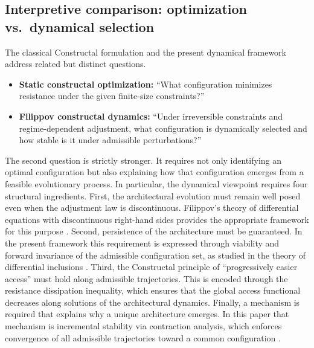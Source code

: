 \documentclass[12pt]{article}
\theoremstyle{plain}
\theoremstyle{definition}
\theoremstyle{remark}
\begin{document}
\subsection{Interpretive comparison: optimization vs.\ dynamical selection}
\label{subsec:discussion_opt_vs_dyn}

The classical Constructal formulation and the present dynamical
framework address related but distinct questions.

\begin{itemize}[leftmargin=1.5em]

\item \textbf{Static constructal optimization:}
``What configuration minimizes resistance under the given
finite-size constraints?''

\item \textbf{Filippov constructal dynamics:}
``Under irreversible constraints and regime-dependent adjustment,
what configuration is dynamically selected and how stable is it
under admissible perturbations?''

\end{itemize}

The second question is strictly stronger.
It requires not only identifying an optimal configuration but also
explaining how that configuration emerges from a feasible evolutionary
process.
In particular, the dynamical viewpoint requires four structural
ingredients. First, the architectural evolution must remain well posed even when the
adjustment law is discontinuous.
Filippov’s theory of differential equations with discontinuous
right-hand sides provides the appropriate framework for this purpose
\cite{Filippov1988,diBernardo2008}. Second, persistence of the architecture must be guaranteed.
In the present framework this requirement is expressed through
viability and forward invariance of the admissible configuration set,
as studied in the theory of differential inclusions
\cite{Aubin1983DifferentialInclusions}. Third, the Constructal principle of ``progressively easier access''
must hold along admissible trajectories.
This is encoded through the resistance dissipation inequality,
which ensures that the global access functional decreases along
solutions of the architectural dynamics. Finally, a mechanism is required that explains why a unique
architecture emerges.
In this paper that mechanism is incremental stability via contraction
analysis, which enforces convergence of all admissible trajectories
toward a common configuration
\cite{LohmillerSlotine1998}.
\end{document}
